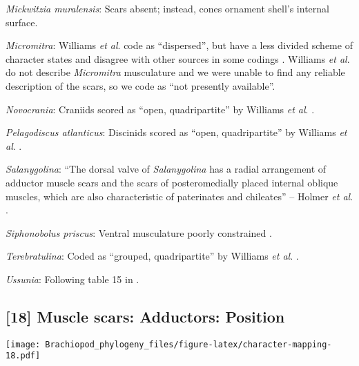 \documentclass[openany]{book}
\theoremstyle{definition}
\theoremstyle{definition}
\theoremstyle{definition}
\theoremstyle{remark}
\begin{document}
\hypertarget{Mickwitzia_muralensis-coding-17}{}
\emph{Mickwitzia muralensis}: Scars absent; instead, cones ornament
shell's internal surface.

\hypertarget{Micromitra-coding-17}{}
\emph{Micromitra}: Williams \emph{et al}.
\citeyearpar{Williams1998Thediversity} code as ``dispersed'', but have a
less divided scheme of character states and disagree with other sources
in some codings \citep[e.g.][in
Kutorginates]{Bassett2001Functionalmorphology}. Williams \emph{et al}.
\citeyearpar{Williams2000LinguliformeaCraniiformea} do not describe
\emph{Micromitra} musculature and we were unable to find any reliable
description of the scars, so we code as ``not presently available''.

\hypertarget{Novocrania-coding-17}{}
\emph{Novocrania}: Craniids scored as ``open, quadripartite'' by
Williams \emph{et al}. \citeyearpar{Williams1996Asupra}.

\hypertarget{Pelagodiscus_atlanticus-coding-17}{}
\emph{Pelagodiscus atlanticus}: Discinids scored as ``open,
quadripartite'' by Williams \emph{et al}.
\citeyearpar{Williams1996Asupra}.

\hypertarget{Salanygolina-coding-17}{}
\emph{Salanygolina}: ``The dorsal valve of \emph{Salanygolina} has a
radial arrangement of adductor muscle scars and the scars of
posteromedially placed internal oblique muscles, which are also
characteristic of paterinates and chileates'' -- Holmer \emph{et al}.
\citeyearpar{Holmer2009Theenigmatic}.

\hypertarget{Siphonobolus_priscus-coding-17}{}
\emph{Siphonobolus priscus}: Ventral musculature poorly constrained
\citep{Williams2000LinguliformeaCraniiformea, Popov2009Earlyontogeny}.

\hypertarget{Terebratulina-coding-17}{}
\emph{Terebratulina}: Coded as ``grouped, quadripartite'' by Williams
\emph{et al}. \citeyearpar{Williams1996Asupra}.

\hypertarget{Ussunia-coding-17}{}
\emph{Ussunia}: Following table 15 in
\citet{Williams2000LinguliformeaCraniiformea}.

\subsection*{{[}18{]} Muscle scars: Adductors:
Position}\label{muscle-scars-adductors-position}

\texttt{[image: Brachiopod\_phylogeny\_files/figure-latex/character-mapping-18.pdf]}
\end{document}
